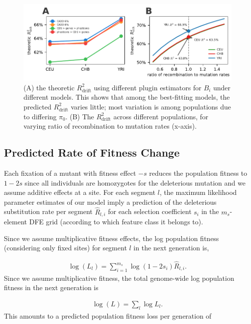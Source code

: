 \documentclass[11pt]{article}
\begin{document}
\begin{figure}[htbp] \centering
    \includegraphics[width=\textwidth]{figures/supplementary/suppfigure_drift_R2.pdf}
    \caption{(A) the theoretic $R_\text{drift}^2$ using different plugin
        estimators for $B_i$ under different models. This shows that among the
        best-fitting models, the predicted $R_\text{drift}^2$ varies little;
        most variation is among populations due to differing $\pi_0$. (B) The 
        $R_\text{drift}^2$ across different populations, for varying ratio of recombination
        to mutation rates (x-axis).}
  \label{suppfig:drift_r2}
\end{figure}

\subsection{Predicted Rate of Fitness Change}

Each fixation of a mutant with fitness effect $-s$ reduces the population
fitness to $1-2s$ since all individuals are homozygotes for the deleterious
mutation and we assume additive effects at a site. For each segment $l$, the
maximum likelihood parameter estimates of our model imply a prediction of the
deleterious substitution rate per segment $\widehat{R}_{l,i}$ for each
selection coefficient $s_i$ in the $m_s$-element DFE grid (according to which
feature class it belongs to).

Since we assume multiplicative fitness effects, the log population fitness
(considering only fixed sites) for segment $l$ in the next generation is,

\begin{align}
    \log(L_{l}) = \sum_{i=1}^{m_s} \log(1-2 s_i) \widehat{R}_{l,i}.
\end{align}
%
Since we assume multiplicative fitness, the total genome-wide log population
fitness in the next generation is

\begin{align}
    \log(L) = \sum_{l} \log{L_l}.
\end{align}
%
This amounts to a predicted population fitness loss per generation of
\end{document}
